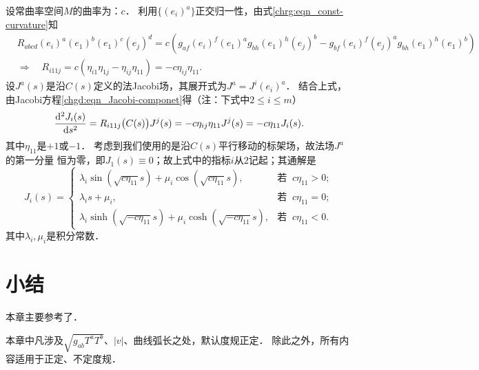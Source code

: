 设常曲率空间$M$的曲率为：$c$．
利用$\{(e_i)^a\}$正交归一性，由式\eqref{chrg:eqn_const-curvature}知
\begin{align*}
    &R_{abcd} (e_i)^a (e_1)^b (e_1)^c (e_j)^d  =
      c(g_{af}(e_i)^f (e_1)^a  g_{bh}(e_1)^h(e_j)^b
        -g_{bf}(e_i)^f (e_j)^a  g_{bh}(e_1)^h(e_1)^b )  \\
    &\Rightarrow\quad R_{i11j} = c (\eta_{i1}\eta_{1j}- \eta_{ij}\eta_{11} )
       = -c \eta_{ij}\eta_{11} .
\end{align*}
设$J^a(s)$是沿$C(s)$定义的法Jacobi场，其展开式为$J^a=J^i (e_i)^a$．
结合上式，由Jacobi方程\eqref{chgd:eqn_Jacobi-componet}得（注：下式中$2 \leqslant i \leqslant m$）
\begin{equation}
    \frac{{\rm d}^2 J_i(s)}{{\rm d} s^2} =R_{i11j}\bigl(C(s)\bigr) J^j(s)
      = -c \eta_{ij}\eta_{11} J^j(s) =-c \eta_{11} J_i(s) .
\end{equation}
其中$\eta_{11}$是$+1$或$-1$．
考虑到我们使用的是沿$C(s)$平行移动的标架场，故{\kaishu 法场}$J^a$的第一分量
恒为零，即$J_1(s)\equiv 0$；故上式中的指标$i$从$2$记起；其通解是
\begin{equation}\label{chgd:eqn_Jacobi-const-curvature}
    J_i(s) = \begin{cases}
        \lambda_i \sin(\sqrt{c \eta_{11}} s)  + \mu_i \cos(\sqrt{c \eta_{11}} s ),
            & \text{若 }\ c \eta_{11} >0 ; \\
        \lambda_i s  + \mu_i , & \text{若 }\ c \eta_{11} = 0; \\
        \lambda_i \sinh(\sqrt{- c \eta_{11}} s) + \mu_i \cosh(\sqrt{-c \eta_{11}} s) ,
            & \text{若 }\ c \eta_{11}<0 .
    \end{cases}
\end{equation}
其中$\lambda_i, \mu_i$是积分常数．




\section*{小结}
本章主要参考了\parencite[Ch.3, Ch.5, Ch.6]{chen-li-2023-2ed-v1}．



本章中凡涉及$\sqrt{g_{ab}T^a T^b}$、$|v|$、曲线弧长之处，默认度规正定．
除此之外，所有内容适用于正定、不定度规．



